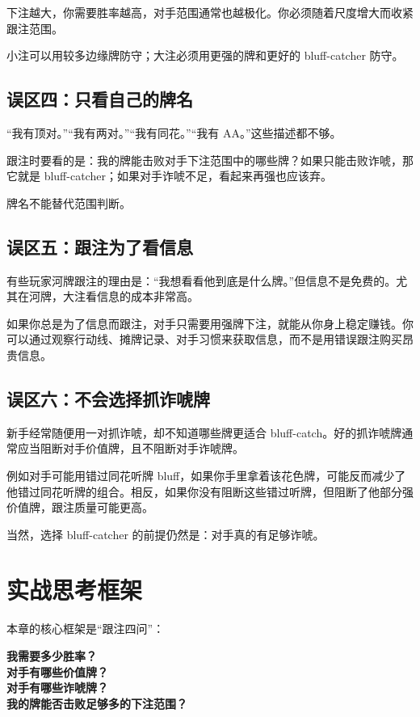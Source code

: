 下注越大，你需要胜率越高，对手范围通常也越极化。你必须随着尺度增大而收紧跟注范围。

小注可以用较多边缘牌防守；大注必须用更强的牌和更好的 bluff-catcher 防守。

\subsection{误区四：只看自己的牌名}

“我有顶对。”“我有两对。”“我有同花。”“我有 AA。”这些描述都不够。

跟注时要看的是：我的牌能击败对手下注范围中的哪些牌？如果只能击败诈唬，那它就是 bluff-catcher；如果对手诈唬不足，看起来再强也应该弃。

牌名不能替代范围判断。

\subsection{误区五：跟注为了看信息}

有些玩家河牌跟注的理由是：“我想看看他到底是什么牌。”但信息不是免费的。尤其在河牌，大注看信息的成本非常高。

如果你总是为了信息而跟注，对手只需要用强牌下注，就能从你身上稳定赚钱。你可以通过观察行动线、摊牌记录、对手习惯来获取信息，而不是用错误跟注购买昂贵信息。

\subsection{误区六：不会选择抓诈唬牌}

新手经常随便用一对抓诈唬，却不知道哪些牌更适合 bluff-catch。好的抓诈唬牌通常应当阻断对手价值牌，且不阻断对手诈唬牌。

例如对手可能用错过同花听牌 bluff，如果你手里拿着该花色牌，可能反而减少了他错过同花听牌的组合。相反，如果你没有阻断这些错过听牌，但阻断了他部分强价值牌，跟注质量可能更高。

当然，选择 bluff-catcher 的前提仍然是：对手真的有足够诈唬。

\section{实战思考框架}

本章的核心框架是“跟注四问”：

\begin{center}
\textbf{我需要多少胜率？\\
对手有哪些价值牌？\\
对手有哪些诈唬牌？\\
我的牌能否击败足够多的下注范围？}
\end{center}

